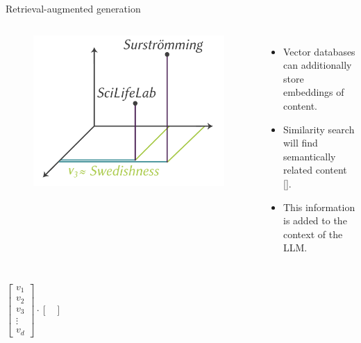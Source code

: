 \documentclass[10pt]{beamer}
\newcommand{\citeme}[1]{{\xspace\color{scAqua} \scriptsize [\cite{#1}]}}
\begin{document}
\begin{frame}{Retrieval-augmented generation}
	\begin{columns}[T,onlytextwidth]
		\hspace*{-0.7cm} 
		\begin{figure}
			\includegraphics[width=\textwidth]{figures/3D_word_to_vec_similarity.png}
		\end{figure}
		\vspace{0.7cm}
		\begin{itemize}
			\item Vector databases can additionally store embeddings of content.  
			\item Similarity search will find semantically related content\citeme{Douze2024}.
			\item This information is added to the context of the LLM.
		\end{itemize}
	\end{columns}
	\begin{columns}[T,onlytextwidth]
		\hspace*{-0.7cm} 
		\vspace{-0.3cm}
		$$
		\begin{bmatrix}
			v_1 \\
			v_2 \\
			v_3 \\
			\vdots \\
			v_d
		\end{bmatrix}
		\cdot
		\begin{bmatrix}

\end{bmatrix}$$
\end{columns}
\end{frame}
\end{document}

